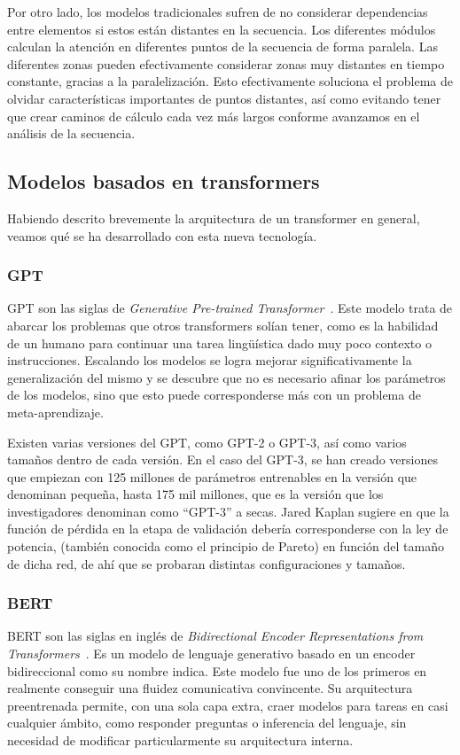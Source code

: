 Por otro lado, los modelos tradicionales sufren de no considerar dependencias entre elementos si estos están distantes en la secuencia. Los diferentes módulos calculan la atención en diferentes puntos de la secuencia de forma paralela. Las diferentes zonas pueden efectivamente considerar zonas muy distantes en tiempo constante, gracias a la paralelización. Esto efectivamente soluciona el problema de olvidar características importantes de puntos distantes, así como evitando tener que crear caminos de cálculo cada vez más largos conforme avanzamos en el análisis de la secuencia.


\subsection{Modelos basados en transformers}
Habiendo descrito brevemente la arquitectura de un transformer en general, veamos qué se ha desarrollado con esta nueva tecnología.

\subsubsection{GPT}
GPT son las siglas de \textit{Generative Pre-trained Transformer}~\cite{GPT3openAI2020}. Este modelo trata de abarcar los problemas que otros transformers solían tener, como es la habilidad de un humano para continuar una tarea lingüística dado muy poco contexto o instrucciones. Escalando los modelos se logra mejorar significativamente la generalización del mismo y se descubre que no es necesario afinar los parámetros de los modelos, sino que esto puede corresponderse más con un problema de meta-aprendizaje.

Existen varias versiones del GPT, como GPT-2 o GPT-3, así como varios tamaños dentro de cada versión. En el caso del GPT-3, se han creado versiones que empiezan con 125 millones de parámetros entrenables en la versión que denominan pequeña, hasta 175 mil millones, que es la versión que los investigadores denominan como ``GPT-3'' a secas. Jared Kaplan sugiere en \cite{kaplan2020scaling} que la función de pérdida en la etapa de validación debería corresponderse con la ley de potencia, (también conocida como el principio de Pareto) en función del tamaño de dicha red, de ahí que se probaran distintas configuraciones y tamaños.

\subsubsection{BERT}
BERT son las siglas en inglés de \textit{Bidirectional Encoder Representations from Transformers}~\cite{bertDevlin2019}. Es un modelo de lenguaje generativo basado en un encoder bidireccional como su nombre indica. Este modelo fue uno de los primeros en realmente conseguir una fluidez comunicativa convincente. Su arquitectura preentrenada permite, con una sola capa extra, craer modelos para tareas en casi cualquier ámbito, como responder preguntas o inferencia del lenguaje, sin necesidad de modificar particularmente su arquitectura interna.

